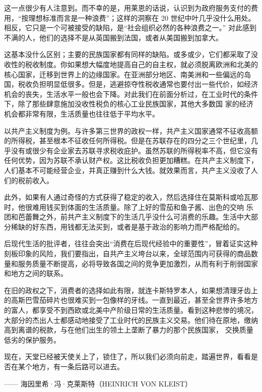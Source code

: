 这一点很少有人注意到。而不幸的是，用莱恩的话说，认识到为政府服务支付的费用，“按理想标准而言是一种浪费”；这样的洞察在 20 世纪中叶几乎没什么用处。相反，它只是一个可被接受的缺陷，是“社会组织必然的各种浪费之一。” 对此感到不满的人，他们的选择不是从英国搬到法国，或者从美国搬到加拿大。

这基本没什么区别；主要的民族国家都有同样的缺陷。或多或少，它们都采取了没收性的税收制度。你如果想大幅度地提高自己的自主权，就必须脱离欧洲和北美的核心国家，迁移到世界上的边缘国家。在亚洲部分地区、南美洲和一些偏远的岛国，税收负担明显低很多。但是，逃避掠夺性税收通常也要付出一些代价，如经济机会的丧失，生活水平一般也会下降。对此我们在前面分析过，在工业时代的条件下，除了那些肆意施加没收性税负的核心工业民族国家，其他大多数国 家的经济机会都非常有限，生活质量也往往低于平均水平。

以共产主义制度为例。与许多第三世界的政权一样，共产主义国家通常不征收高额的所得税，甚至根本不征收任何所得税。但是在苏联存在的四分之三个世纪里，几乎没有或很少有企业家去苏联寻求税收庇护。虽然苏联的所得税率不高，但它没有任何优势，因为苏联不承认财产权。这比税收负担更加糟糕。在共产主义制度下，人们基本不可能经营企业，并真正赚到什么大钱。就效果而言，共产主义没收了人们的税前收入。

此外，如果有人通过奇怪的方式获得了稳定的收入，然后选择住在莫斯科或哈瓦那时，他很难用钱买到体面的生活质量。除了上好的雪茄和鱼子酱、出色的交响 乐团和芭蕾舞之外，前共产主义制度下的生活几乎没什么可消费的乐趣。生活中大部分稀缺的好东西，用钱都无法买到，或者是基于政治的影响力而严格配给的。

后现代生活的批评者，往往会突出“消费在后现代经验中的重要性”，冒着证实这种刻板印象的风险，我们要指出，自共产主义垮台以来，全球范围内可获得的商品数量和服务质量不断提高，必将导致各国之间的竞争更加激烈，从而有利于削弱国家和地方之间的联系。

在旧的政权之下，消费者的选择如此有限，就连卡斯特罗本人，如果想清理牙齿上的高斯巴雪茄碎片也很难买到一包像样的牙线。一直到最近，甚至全世界许多地方的富人，都享受不到西欧或北美中产阶级日常的生活质量。看到这种悲惨的境况，大部分的杰出人士都感动地接受了工业时代的民族主义交易。他们待在原地，缴纳高到离谱的税款，与在他们出生的领土上垄断了暴力的那个民族国家， 交换质量低劣的保护服务。

\begin{tcolorbox}
\kaishu 现在，天堂已经被天使关上了，锁住了，所以我们必须向前走，踏遍世界，看看是否在某个地方，有一条后路可以进去。
\begin{flushright}
—— 海因里希·冯·克莱斯特（HEINRICH VON KLEIST） 
\end{flushright}
\end{tcolorbox}


